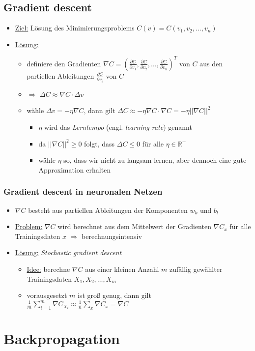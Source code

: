 \documentclass{scrartcl}
\begin{document}
\subsection{Gradient descent}

\begin{itemize}
  \item \underline{Ziel:} Lösung des Minimierungsproblems $C(v) = C(v_1, v_2, \ldots, v_n)$
  \item \underline{Lösung:}
  \begin{itemize}
    \item definiere den Gradienten $\nabla C  = {(\frac{\partial C}{\partial v_1}, \frac{\partial C}{\partial v_2}, \ldots, \frac{\partial C}{\partial v_n})}^T$ von $C$ aus den partiellen Ableitungen $\frac{\partial C}{\partial v_i}$ von $C$
    \item $\Rightarrow$ $\Delta C \approx \nabla  C \cdot \Delta v$
    \item wähle $\Delta v = - \eta \nabla C$, dann gilt $\Delta C \approx - \eta \nabla C \cdot \nabla C  = - \eta ||\nabla C||^2$
    \begin{itemize}
      \item $\eta$ wird das \emph{Lerntempo} (engl. \emph{learning rate}) genannt
      \item da $||\nabla C||^2 \geq 0$ folgt, dass $\Delta C \leq 0$ für alle $\eta \in \mathbb{R}^+$
      \item wähle $\eta$ so, dass wir nicht zu langsam lernen, aber dennoch eine gute Approximation erhalten
    \end{itemize}
  \end{itemize}
\end{itemize}

\subsubsection{Gradient descent in neuronalen Netzen}

\begin{itemize}
  \item $\nabla C$ besteht aus partiellen Ableitungen der Komponenten $w_k$ und $b_l$
  \item \underline{Problem:} $\nabla C$ wird berechnet aus dem Mittelwert der Gradienten $\nabla C_x$ für alle Trainingsdaten $x$ $\Rightarrow$ berechnungsintensiv
  \item \underline{Lösung:} \emph{Stochastic gradient descent}
  \begin{itemize}
    \item \underline{Idee:} berechne $\nabla C$ aus einer kleinen Anzahl $m$ zufällig gewählter Trainingsdaten $X_1, X_2, \ldots, X_m$
    \item vorausgesetzt $m$ ist groß genug, dann gilt $\frac{1}{m} \sum_{i=1}^m \nabla C_{X_i} \approx \frac{1}{n} \sum_x \nabla C_x = \nabla C$
  \end{itemize}
\end{itemize}

\section{Backpropagation}
\end{document}
